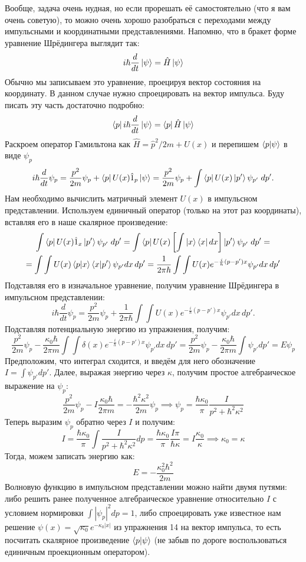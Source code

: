 Вообще, задача очень нудная, но если прорешать её самостоятельно (что я вам очень советую), то можно очень хорошо разобраться с переходами между импульсными и координатными представлениями. Напомню, что в бракет форме уравнение Шрёдингера выглядит так:
\[
i\hbar \frac{d}{dt} \ket{\psi} = \hat H \ket{\psi}
\]
Обычно мы записываем это уравнение, проецируя вектор состояния на координату. В данном случае нужно спроецировать на вектор импульса. Буду писать эту часть достаточно подробно:
\[
\bra{p} i\hbar \frac{d}{dt} \ket{\psi} = \bra{p} \hat H \ket{\psi}
\]
Раскроем оператор Гамильтона как $\hat H = \hat p^2 / 2m + U(x)$ и перепишем $\bra{p}\ket{\psi}$ в виде $\psi_p$
\[
i\hbar \frac{d}{dt} \psi_p = \frac{p^2}{2m}\psi_p + \bra{p}U(x)\hat{1}_p\ket{\psi} = \frac{p^2}{2m}\psi_p + \int\bra{p}U(x)\ket{p'}\psi_{p'}\;dp'.
\]
Нам необходимо вычислить матричный элемент $U(x)$ в импульсном представлении. Используем единичный оператор (только на этот раз координаты), вставляя его в наше скалярное произведение:
\begin{gather*}
\int\bra{p}U(x)\hat{1}_x\ket{p'}\psi_{p'}\;dp' = \int \bra{p}U(x)\left[\int\ket{x}\bra{x}dx\right]\ket{p'} \psi_{p'}\;dp'= \\
= \int\int U(x)\bra{p}\ket{x}\bra{x}\ket{p'} \psi_{p'} dx\,dp' = \frac{1}{2\pi\hbar}\int\int U(x) e^{-\frac{i}{h}(p-p')x}\psi_{p'} dx\,dp'
\end{gather*}
Подставляя его в изначальное уравнение, получим уравнение Шрёдингера в импульсном представлении:
\[
i\hbar \frac{d}{dt} \psi_p =\frac{p^2}{2m}\psi_p + \frac{1}{2\pi\hbar}\int\int U(x) e^{-\frac{i}{h}(p-p')x}\psi_{p'} dx\,dp'.
\]
Подставляя потенциальную энергию из упражнения, получим:
\[
\frac{p^2}{2m}\psi_p - \frac{\kappa_0\hbar}{2\pi m}\int\int \delta(x) e^{-\frac{i}{h}(p-p')x}\psi_{p'} dx\,dp'= \frac{p^2}{2m}\psi_p - \frac{\kappa_0\hbar}{2\pi m}\int\psi_{p'} dp' =  E\psi_p
\]
Предположим, что интеграл сходится, и введём для него обозначение $I = \int \psi_{p'}dp'$. Далее, выражая энергию через $\kappa$, получим простое алгебраическое выражение на $\psi_p$:
\[
\frac{p^2}{2m}\psi_p - I\frac{\kappa_0\hbar}{2\pi m} = -\frac{\hbar^2\kappa^2}{2m}\psi_p \implies \psi_p = \frac{\hbar\kappa_0}{\pi}\frac{I}{p^2 + \hbar^2\kappa^2}
\]
Теперь выразим $\psi_p$ обратно через $I$ и получим:
\[
I = \frac{\hbar\kappa_0}{\pi}\int\frac{I}{p^2 + \hbar^2\kappa^2}dp = \frac{\hbar \kappa_0}{\pi}\frac{I \pi}{\hbar\kappa} = I\frac{\kappa_0}{\kappa} \implies \kappa_0 = \kappa
\]
Тогда, можем записать энергию как: 
\[
E = -\frac{\kappa^2_0\hbar^2}{2m}
\]
Волновую функцию в импульсном представлении можно найти двумя путями: либо решить ранее полученное алгебраическое уравнение относительно $I$ с условием нормировки $\int|\psi_p|^2dp = 1$, либо спроецировать уже известное нам решение $\psi(x) =\sqrt{\kappa_0}e^{-\kappa_0|x|}$ из упражнения 14 на вектор импульса, то есть посчитать скалярное произведение $\bra{p}\ket{\psi}$ (не забыв по дороге воспользоваться единичным проекционным оператором).

